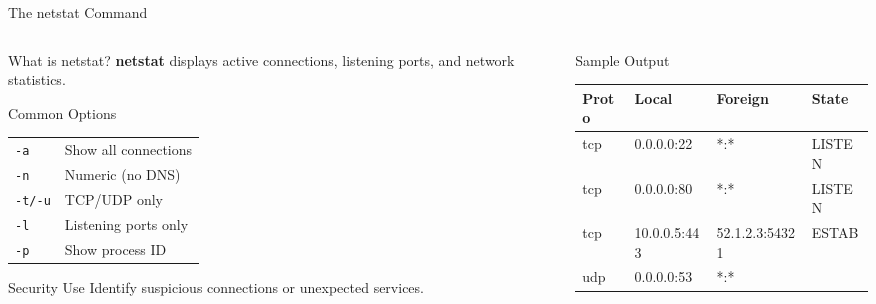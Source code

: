 \documentclass[aspectratio=169, 11pt]{beamer}
\newcommand{\keyterm}[1]{\textbf{\textcolor{rctcblue}{#1}}}
\begin{document}
\begin{frame}{The netstat Command}
    \begin{columns}[T]
        \begin{column}{0.48\textwidth}
            \begin{block}{What is netstat?}
                \small
                \keyterm{netstat} displays active connections, listening ports, and network statistics.
            \end{block}
            
            \vspace{0.2em}
            \begin{block}{Common Options}
                \footnotesize
                \begin{tabular}{l l}
                    \texttt{-a} & Show all connections \\
                    \texttt{-n} & Numeric (no DNS) \\
                    \texttt{-t/-u} & TCP/UDP only \\
                    \texttt{-l} & Listening ports only \\
                    \texttt{-p} & Show process ID \\
                \end{tabular}
            \end{block}
            
            \vspace{0.2em}
            \begin{alertblock}{Security Use}
                \small
                Identify suspicious connections or unexpected services.
            \end{alertblock}
        \end{column}
        \begin{column}{0.48\textwidth}
            \begin{block}{Sample Output}
                \ttfamily\tiny
                \begin{tabular}{l l l l}
                    Proto & Local & Foreign & State \\
                    \hline
                    tcp & 0.0.0.0:22 & *:* & LISTEN \\
                    tcp & 0.0.0.0:80 & *:* & LISTEN \\
                    tcp & 10.0.0.5:443 & 52.1.2.3:54321 & ESTAB \\
                    udp & 0.0.0.0:53 & *:* & \\
                \end{tabular}
            \end{block}
            

\end{column}
\end{columns}
\end{frame}
\end{document}
